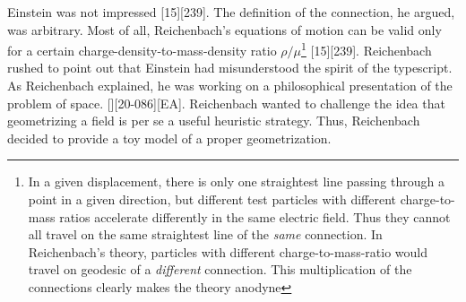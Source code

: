 \documentclass[draft]{article}
\newcommand{\ap}{\ensuremath{\tau}\xspace}
\newcommand{\xdx}{\ensuremath{x_\nu} and \ensuremath{x_\nu + dx_\nu}\xspace}
\begin{document}



Einstein was not impressed [15][239]. The definition of the connection, he argued, was arbitrary. Most of all, Reichenbach's equations of motion can be valid only for a certain charge-density-to-mass-density ratio $\rho/\mu$\footnote{In a given displacement, there is only one straightest line passing through a point in a given direction, but different test particles with different charge-to-mass ratios accelerate differently in the same electric field. Thus they cannot all travel on the same straightest line of the \emph{same} connection. In Reichenbach's theory, particles with different charge-to-mass-ratio would travel on geodesic of a \emph{different} connection. This multiplication of the connections clearly makes the theory anodyne} [15][239]. Reichenbach rushed to point out that Einstein had misunderstood the spirit of the typescript. As Reichenbach explained, he was working on a philosophical presentation of the problem of space. [][20-086][EA]. Reichenbach wanted to challenge the idea that geometrizing a field is per se a useful heuristic strategy. Thus, Reichenbach decided to provide a toy model of a proper geometrization. 
\end{document}
